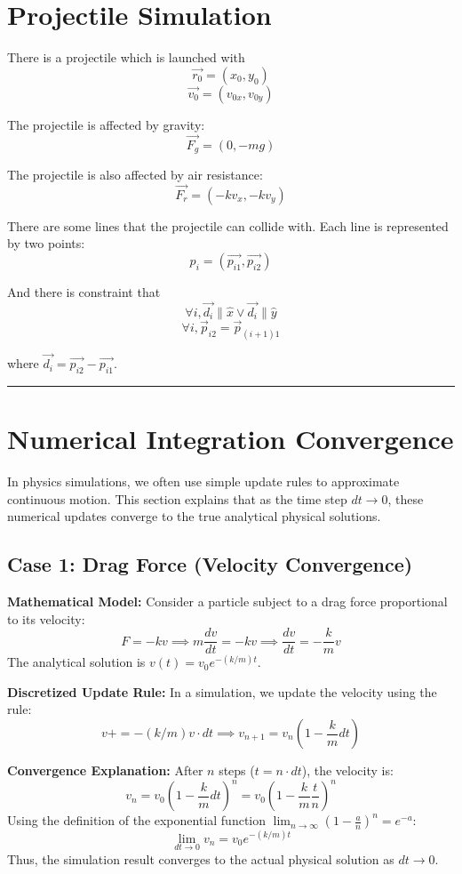 \section*{Projectile Simulation}

There is a projectile which is launched with
\[
\vec{r_0} = (x_0, y_0)
\]
\[
\vec{v_0} = (v_{0x}, v_{0y})
\]

The projectile is affected by gravity:
\[
\vec{F_g} = (0, -mg)
\]

The projectile is also affected by air resistance:
\[
\vec{F_r} = (-k v_x, -k v_y)
\]

There are some lines that the projectile can collide with. Each line is represented by two points:
\[
p_i = (\vec{p_{i1}}, \vec{p_{i2}})
\]

And there is constraint that
\[
\forall i, \vec{d_i} \parallel \hat{x} \lor \vec{d_i} \parallel \hat{y}
\]
\[
\forall i, \vec{p}_{i2} = \vec{p}_{(i+1)1}
\]

where $\vec{d_i} = \vec{p_{i2}} - \vec{p_{i1}}$.


\vspace{3em}
\hrule
\vspace{2em}

\section*{Numerical Integration Convergence}

In physics simulations, we often use simple update rules to approximate continuous motion. This section explains that as the time step $dt \to 0$, these numerical updates converge to the true analytical physical solutions.

\subsection*{Case 1: Drag Force (Velocity Convergence)}

\textbf{Mathematical Model:}
Consider a particle subject to a drag force proportional to its velocity:
\[
F = -k v \implies m \frac{dv}{dt} = -k v \implies \frac{dv}{dt} = -\frac{k}{m} v
\]
The analytical solution is $v(t) = v_0 e^{-(k/m)t}$.

\textbf{Discretized Update Rule:}
In a simulation, we update the velocity using the rule:
\[
v += -(k/m) v \cdot dt \implies v_{n+1} = v_n \left(1 - \frac{k}{m} dt\right)
\]

\textbf{Convergence Explanation:}
After $n$ steps ($t = n \cdot dt$), the velocity is:
\[
v_n = v_0 \left(1 - \frac{k}{m} dt\right)^n = v_0 \left(1 - \frac{k}{m} \frac{t}{n}\right)^n
\]
Using the definition of the exponential function $\lim_{n \to \infty} (1 - \frac{a}{n})^n = e^{-a}$:
\[
\lim_{dt \to 0} v_n = v_0 e^{-(k/m)t}
\]
Thus, the simulation result converges to the actual physical solution as $dt \to 0$.

